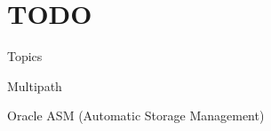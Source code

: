 \chapter{TODO}

Topics
\begin{enumbox}
\item Multipath
\item Oracle ASM (Automatic Storage Management)
\end{enumbox}

